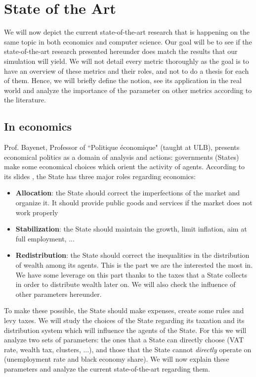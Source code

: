 \chapter{State of the Art}\label{section:state_of_the_art}

We will now depict the current state-of-the-art research that is happening on the same topic in both economics and computer science.
Our goal will be to see if the state-of-the-art research presented hereunder does match the results that our simulation will yield. We will not detail every metric thoroughly as the goal is to have an overview of these metrics and their roles, and not to do a thesis for each of them. Hence, we will briefly define the notion, see its application in the real world and analyze the importance of the parameter on other metrics according to the literature.

\section{In economics}

Prof. Bayenet, Professor of ``Politique économique" (taught at ULB), presents economical politics as a domain of analysis and actions: governments (States) make some economical choices which orient the activity of agents. According to its slides \cite{bayenetSlides1}, the State has three major roles regarding economics:

\begin{itemize}
    \item \textbf{Allocation}: the State should correct the imperfections of the market and organize it. It should provide public goods and services if the market does not work properly
    \item \textbf{Stabilization}: the State should maintain the growth, limit inflation, aim at full employment, ... 
    \item \textbf{Redistribution}: the State should correct the inequalities in the distribution of wealth among its agents. This is the part we are the interested the most in. We have some leverage on this part thanks to the taxes that a State collects in order to distribute wealth later on. We will also check the influence of other parameters hereunder.
\end{itemize} 

To make these possible, the State should make expenses, create some rules and levy taxes. We will study the choices of the State regarding its taxation and its distribution system which will influence the agents of the State. For this we will analyze two sets of parameters: the ones that a State can directly choose (VAT rate, wealth tax, clusters, ...), and those that the State cannot \emph{directly} operate on (unemployment rate and black economy share). We will now explain these parameters and analyze the current state-of-the-art regarding them.

